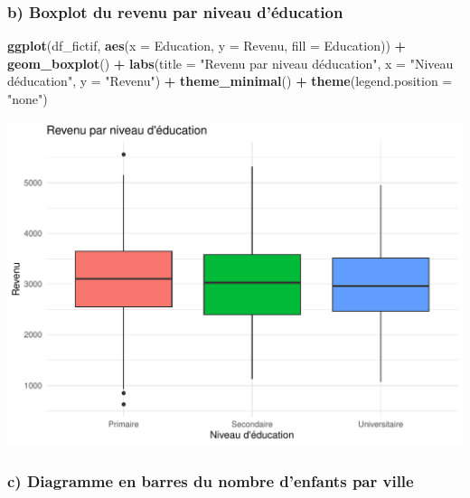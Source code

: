 \documentclass[
]{article}
\newenvironment{Shaded}{\begin{snugshade}}{\end{snugshade}}
\newcommand{\AttributeTok}[1]{\textcolor[rgb]{0.13,0.29,0.53}{#1}}
\newcommand{\FunctionTok}[1]{\textcolor[rgb]{0.13,0.29,0.53}{\textbf{#1}}}
\newcommand{\NormalTok}[1]{#1}
\newcommand{\SpecialCharTok}[1]{\textcolor[rgb]{0.81,0.36,0.00}{\textbf{#1}}}
\newcommand{\StringTok}[1]{\textcolor[rgb]{0.31,0.60,0.02}{#1}}
\begin{document}
\hypertarget{b-boxplot-du-revenu-par-niveau-duxe9ducation}{%
\subsubsection{b) Boxplot du revenu par niveau
d'éducation}\label{b-boxplot-du-revenu-par-niveau-duxe9ducation}}

\begin{Shaded}
\begin{Highlighting}[]
\FunctionTok{ggplot}\NormalTok{(df\_fictif, }\FunctionTok{aes}\NormalTok{(}\AttributeTok{x =}\NormalTok{ Education, }\AttributeTok{y =}\NormalTok{ Revenu, }\AttributeTok{fill =}\NormalTok{ Education)) }\SpecialCharTok{+}
  \FunctionTok{geom\_boxplot}\NormalTok{() }\SpecialCharTok{+}
  \FunctionTok{labs}\NormalTok{(}\AttributeTok{title =} \StringTok{"Revenu par niveau d\textquotesingle{}éducation"}\NormalTok{, }\AttributeTok{x =} \StringTok{"Niveau d\textquotesingle{}éducation"}\NormalTok{, }\AttributeTok{y =} \StringTok{"Revenu"}\NormalTok{) }\SpecialCharTok{+}
  \FunctionTok{theme\_minimal}\NormalTok{() }\SpecialCharTok{+}
  \FunctionTok{theme}\NormalTok{(}\AttributeTok{legend.position =} \StringTok{"none"}\NormalTok{)}
\end{Highlighting}
\end{Shaded}

\includegraphics{TP_1_files/figure-latex/boxplot-revenu-education-1.pdf}

\hypertarget{c-diagramme-en-barres-du-nombre-denfants-par-ville}{%
\subsubsection{c) Diagramme en barres du nombre d'enfants par
ville}\label{c-diagramme-en-barres-du-nombre-denfants-par-ville}}
\end{document}
